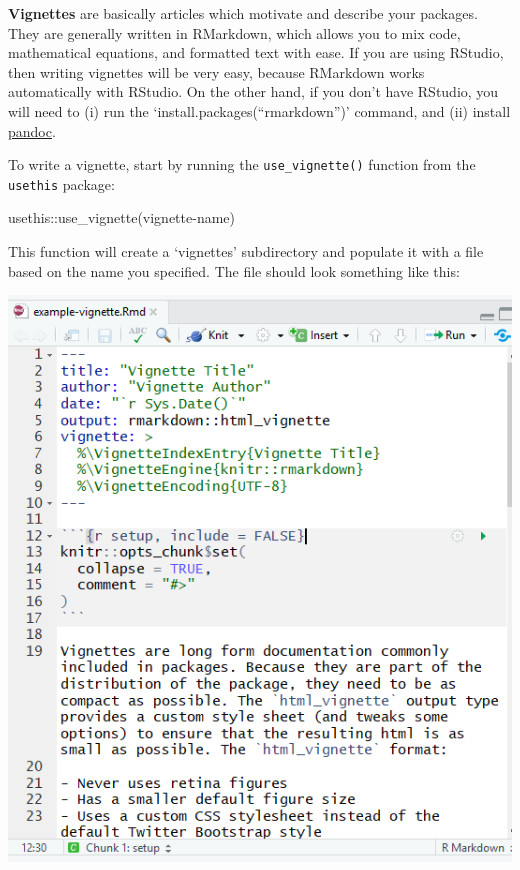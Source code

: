 \documentclass[
]{book}
\newenvironment{Shaded}{\begin{snugshade}}{\end{snugshade}}
\newcommand{\FunctionTok}[1]{\textcolor[rgb]{0.00,0.00,0.00}{#1}}
\newcommand{\NormalTok}[1]{#1}
\newcommand{\SpecialCharTok}[1]{\textcolor[rgb]{0.00,0.00,0.00}{#1}}
\newcommand{\StringTok}[1]{\textcolor[rgb]{0.31,0.60,0.02}{#1}}
\begin{document}
\textbf{Vignettes} are basically articles which motivate and describe your packages. They are generally written in RMarkdown, which allows you to mix code, mathematical equations, and formatted text with ease. If you are using RStudio, then writing vignettes will be very easy, because RMarkdown works automatically with RStudio. On the other hand, if you don't have RStudio, you will need to (i) run the `install.packages(``rmarkdown'')' command, and (ii) install \href{http://pandoc.org/installing.html}{pandoc}.

To write a vignette, start by running the \texttt{use\_vignette()} function from the \texttt{usethis} package:

\begin{Shaded}
\begin{Highlighting}[]
\NormalTok{usethis}\SpecialCharTok{::}\FunctionTok{use\_vignette}\NormalTok{(}\StringTok{\textquotesingle{}vignette{-}name\textquotesingle{}}\NormalTok{)}
\end{Highlighting}
\end{Shaded}

This function will create a `vignettes' subdirectory and populate it with a file based on the name you specified. The file should look something like this:

\includegraphics{images/packageSS/vignette1.PNG}
\end{document}

